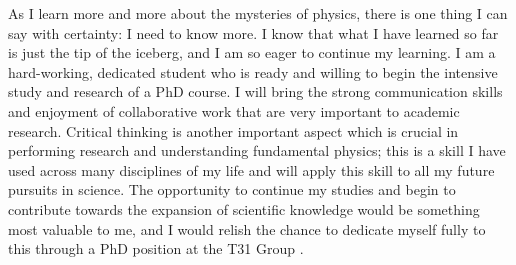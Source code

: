 \documentclass[11pt, a4paper]{awesome-cv}
\newcommand\research{T31 Group  }
\begin{document}
\begin{cvletter}
As I learn more and more about the mysteries of physics, there is one thing I can say with certainty: I need to know more. 
I know that what I have learned so far is just the tip of the iceberg, and I am so eager to continue my learning. 
I am a hard-working, dedicated student who is ready and willing to begin the intensive study and research of a PhD course. 
I will bring the strong communication skills and enjoyment of collaborative work that are very important to academic research. 
Critical thinking is another important aspect which is crucial in performing research and understanding fundamental physics; this is a skill I have used across many disciplines of my life and will apply this skill to all my future pursuits in science.
The opportunity to continue my studies and begin to contribute towards the expansion of scientific knowledge would be something most valuable to me, and I would relish the chance to dedicate myself fully to this through a PhD position at the \research. 

\end{cvletter}


\makeletterclosing
\end{document}
